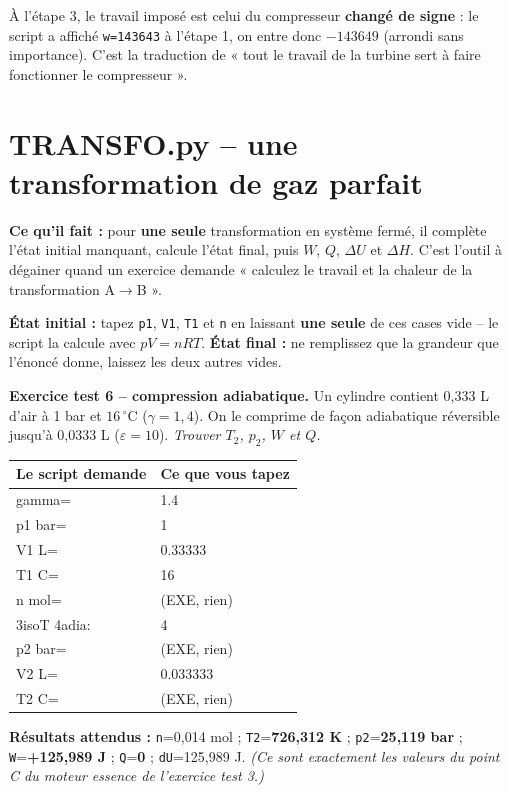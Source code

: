 \documentclass[10.5pt,a4paper]{article}
\makeatletter
\newenvironment{saisie}{%
\begin{center}\small
\begin{tabular}{@{}>{\ttfamily}l l@{}}
\toprule
\textrm{\textbf{Le script demande}} & \textbf{Ce que vous tapez} \\
\midrule
}{%
\bottomrule
\end{tabular}
\end{center}
}
\makeatother
\begin{document}
\begin{piege}
À l'étape 3, le travail imposé est celui du compresseur \textbf{changé de signe} : le script a affiché
\texttt{w=143643} à l'étape 1, on entre donc $-143649$ (arrondi sans importance). C'est la traduction de
« tout le travail de la turbine sert à faire fonctionner le compresseur ».
\end{piege}

\newpage
\section{TRANSFO.py -- une transformation de gaz parfait}

\begin{objectif}
\textbf{Ce qu'il fait :} pour \textbf{une seule} transformation en système fermé, il complète l'état
initial manquant, calcule l'état final, puis $W$, $Q$, $\Delta U$ et $\Delta H$. C'est l'outil à
dégainer quand un exercice demande « calculez le travail et la chaleur de la transformation A$\to$B ».
\end{objectif}

\textbf{État initial :} tapez \texttt{p1}, \texttt{V1}, \texttt{T1} et \texttt{n} en laissant
\textbf{une seule} de ces cases vide -- le script la calcule avec $pV=nRT$.
\textbf{État final :} ne remplissez que la grandeur que l'énoncé donne, laissez les deux autres vides.

\begin{test}
\textbf{Exercice test 6 -- compression adiabatique.} Un cylindre contient 0,333 L d'air à 1 bar et
$16\,^\circ$C ($\gamma=1{,}4$). On le comprime de façon adiabatique réversible jusqu'à 0,0333 L
($\varepsilon=10$). \emph{Trouver $T_2$, $p_2$, $W$ et $Q$.}

\begin{saisie}
gamma= & 1.4 \\
p1 bar= & 1 \\
V1 L= & 0.33333 \\
T1 C= & 16 \\
n mol= & \textrm{(EXE, rien)} \\
3isoT 4adia: & 4 \\
p2 bar= & \textrm{(EXE, rien)} \\
V2 L= & 0.033333 \\
T2 C= & \textrm{(EXE, rien)} \\
\end{saisie}

\textbf{Résultats attendus :} \texttt{n}=0,014 mol ; \texttt{T2}=\textbf{726,312 K} ;
\texttt{p2}=\textbf{25,119 bar} ; \texttt{W}=\textbf{+125,989 J} ; \texttt{Q}=\textbf{0} ;
\texttt{dU}=125,989 J.
\emph{(Ce sont exactement les valeurs du point C du moteur essence de l'exercice test 3.)}
\end{test}
\end{document}
